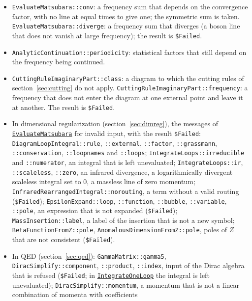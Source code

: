 \documentclass[11pt,a4paper]{article}
\newcommand{\pkg}[1]{\texttt{#1}}
\newcommand{\fnref}[1]{\hyperref[fn:#1]{\pkg{#1}}}
\newcommand{\opt}[1]{\texttt{"#1"}}
\begin{document}
\begin{itemize}
  frequency without statistics; \pkg{::external}, an external point that is not \pkg{label -> \{momentum, I w\}};
  \pkg{::loopnames}, \pkg{::loops}, a value of \opt{LoopMomenta} that is not a list, or that gives fewer names than
  loops; \pkg{::convergence}, a value of \opt{ConvergenceFactor} other than 1, $-1$ and 0.
\item \pkg{EvaluateMatsubara::conv}: a frequency sum that depends on the convergence factor, with no line at equal times
  to give one; the symmetric sum is taken. \pkg{EvaluateMatsubara::diverge}: a frequency sum that diverges (a boson line
  that does not vanish at large frequency); the result is \pkg{\$Failed}.
\item \pkg{AnalyticContinuation::periodicity}: statistical factors that still depend on the frequency being continued.
\item \pkg{CuttingRuleImaginaryPart::class}: a diagram to which the cutting rules of section~\ref{sec:cutting} do not
  apply. \pkg{CuttingRuleImaginaryPart::frequency}: a frequency that does not enter the diagram at one external point and
  leave it at another. The result is \pkg{\$Failed}.
\item In dimensional regularization (section~\ref{sec:dimreg}), the messages of \fnref{EvaluateMatsubara} for invalid
  input, with the result \pkg{\$Failed}: \pkg{DiagramLoopIntegral::rule}, \pkg{::external}, \pkg{::factor},
  \pkg{::grassmann}, \pkg{::conservation}, \pkg{::loopnames} and \pkg{::loops}; \pkg{IntegrateLoops::irreducible} and \pkg{::numerator}, an integral that is
  left unevaluated; \pkg{IntegrateLoops::ir}, \pkg{::scaleless}, \pkg{::zero}, an infrared divergence, a logarithmically
  divergent scaleless integral set to 0, a massless line of zero momentum; \pkg{InfraredRearrangedIntegral::norouting}, a
  term without a valid routing (\pkg{\$Failed}); \pkg{EpsilonExpand::loop}, \pkg{::function}, \pkg{::bubble},
  \pkg{::variable}, \pkg{::pole}, an expression that is not expanded (\pkg{\$Failed}); \pkg{MassInsertion::label}, a
  label of the insertion that is not a new symbol; \pkg{BetaFunctionFromZ::pole}, \pkg{AnomalousDimensionFromZ::pole},
  poles of $Z$ that are not consistent (\pkg{\$Failed}).
\item In QED (section~\ref{sec:qed}): \pkg{GammaMatrix::gamma5}, \pkg{DiracSimplify::component}, \pkg{::product},
  \pkg{::index}, input of the Dirac algebra that is refused (\pkg{\$Failed}; in \fnref{IntegrateOneLoop} the integral is left
  unevaluated); \pkg{DiracSimplify::momentum}, a momentum that is not a linear combination of momenta with coefficients

\end{itemize}
\end{document}
